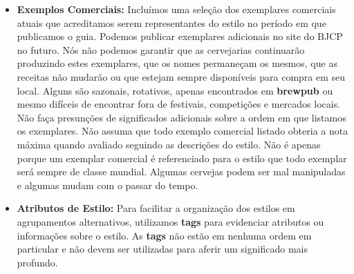 \begin{itemize}
Tenha em mente que essas estatísticas vitais ainda são apenas diretrizes, não dados absolutos. Exemplos Comerciais fora destes parâmetros com certeza existem, mas essas estatísticas são feitas para descrever onde a maior parte dos exemplares está. Elas ajudam a determinar a ordem de julgamento, não se um exemplo deve ser desclassificado.
\item \textbf{Exemplos Comerciais:} Incluímos uma seleção dos exemplares comerciais atuais que acreditamos serem representantes do estilo no período em que publicamos o guia. Podemos publicar exemplares adicionais no site do BJCP no futuro. Nós não podemos garantir que as cervejarias continuarão produzindo estes exemplares, que os nomes permaneçam os mesmos, que as receitas não mudarão ou que estejam sempre disponíveis para compra em seu local. Alguns são sazonais, rotativos, apenas encontrados em \textbf{brewpub} ou mesmo difíceis de encontrar fora de festivais, competições e mercados locais.
Não faça presunções de significados adicionais sobre a ordem em que listamos os exemplares. Não assuma que todo exemplo comercial listado obteria a nota máxima quando avaliado seguindo as descrições do estilo. Não é apenas porque um exemplar comercial é referenciado para o estilo que todo exemplar será sempre de classe mundial. Algumas cervejas podem ser mal manipuladas e algumas mudam com o passar do tempo.
\item \textbf{Atributos de Estilo:} Para facilitar a organização dos estilos em agrupamentos alternativos, utilizamos \textbf{tags} para evidenciar atributos ou informações sobre o estilo. As \textbf{tags} não estão em nenhuma ordem em particular e não devem ser utilizadas para aferir um significado mais profundo.
\end{itemize}
